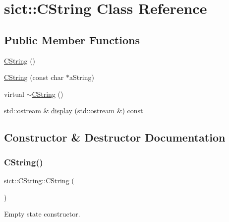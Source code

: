 \hypertarget{classsict_1_1CString}{}\section{sict\+:\+:C\+String Class Reference}
\label{classsict_1_1CString}
\subsection*{Public Member Functions}
\begin{DoxyCompactItemize}
\item 
\mbox{\hyperlink{classsict_1_1CString_a3fa8110472ad4e0dc739710c617a59a0}{C\+String}} ()
\item 
\mbox{\hyperlink{classsict_1_1CString_a807b786908feda29a464144f9e50aee8}{C\+String}} (const char $\ast$a\+String)
\item 
virtual \mbox{\hyperlink{classsict_1_1CString_a2c70dcb73e626d0a80332cda1871d36d}{$\sim$\+C\+String}} ()
\item 
std\+::ostream \& \mbox{\hyperlink{classsict_1_1CString_a4c4f39221992bb2076a11183e34b509c}{display}} (std\+::ostream \&) const
\end{DoxyCompactItemize}


\subsection{Constructor \& Destructor Documentation}
\mbox{\label{classsict_1_1CString_a3fa8110472ad4e0dc739710c617a59a0}} 
\subsubsection{\texorpdfstring{C\+String()}{CString()}\hspace{0.1cm}{\footnotesize\ttfamily [1/2]}}
{\footnotesize\ttfamily sict\+::\+C\+String\+::\+C\+String (\begin{DoxyParamCaption}{ }\end{DoxyParamCaption})}

Empty state constructor. \mbox{\label{classsict_1_1CString_a807b786908feda29a464144f9e50aee8}} 
